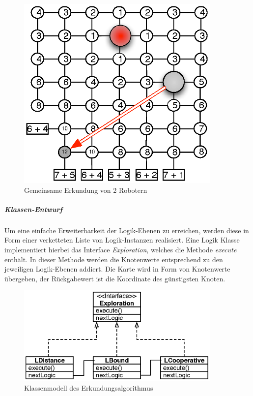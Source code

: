 \documentclass[10pt,a4paper]{article}
\begin{document}
					\begin{figure}[h]
						\centering
						\includegraphics[width=10cm]{images/kooperation.eps}
  						\caption{Gemeinsame Erkundung von 2 Robotern}
  						\label{fig:level2}
  					\end{figure} 
  				\subparagraph*{Klassen-Entwurf} Um eine einfache Erweiterbarkeit der Logik-Ebenen zu erreichen, werden diese in Form einer
  					verketteten Liste von Logik-Instanzen realisiert. Eine Logik Klasse implementiert hierbei das Interface \textit{Exploration}, welches
  					die Methode \textit{execute} enthält. In dieser Methode werden die Knotenwerte entsprechend zu den jeweiligen Logik-Ebenen
  					addiert. Die Karte wird in Form von Knotenwerte übergeben, der Rückgabewert ist die Koordinate des günstigsten Knoten.
 					\begin{figure}[h]
						\centering
						\includegraphics[width=10cm]{images/exploration_design.eps}
  						\caption{Klassenmodell des Erkundungsalgorithmus}
  						\label{fig:klassen_modell}
  					\end{figure} 
\end{document}
